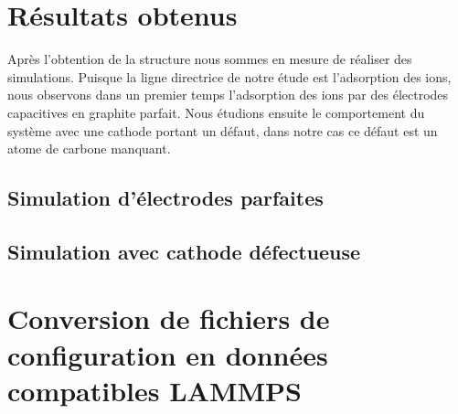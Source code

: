 \documentclass[a4paper, 11pt]{article}
\begin{document}




\section{Résultats obtenus}

Après l'obtention de la structure nous sommes en mesure de réaliser des simulations. Puisque la ligne directrice de notre étude est l'adsorption des ions, nous observons dans un premier temps l'adsorption des ions par des électrodes capacitives en graphite parfait. Nous étudions ensuite le comportement du système avec une cathode portant un défaut, dans notre cas ce défaut est un atome de carbone manquant.


    \subsection{Simulation d'électrodes parfaites}


    \subsection{Simulation avec cathode défectueuse}


\appendix
\section{Conversion de fichiers de configuration en données compatibles LAMMPS} \label{apdx:conversion}




\printbibliography
\end{document}
